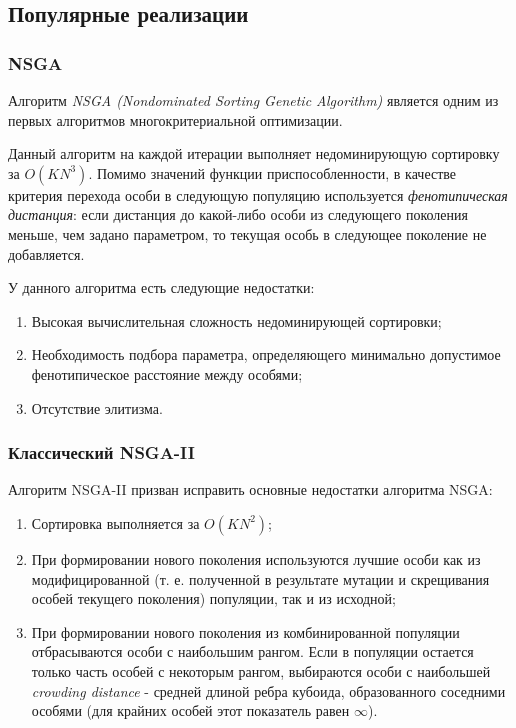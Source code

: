 \subsection{Популярные реализации}
\subsubsection{NSGA}
Алгоритм \textit{NSGA (Nondominated Sorting Genetic Algorithm)} является одним из первых алгоритмов
многокритериальной оптимизации. \cite{deb_nsga2}

Данный алгоритм на каждой итерации выполняет недоминирующую сортировку за $O(KN^3)$.
Помимо значений функции приспособленности, в качестве критерия перехода особи в следующую популяцию
используется \textit{фенотипическая дистанция}: если дистанция до какой-либо особи из следующего 
поколения меньше, чем задано параметром, то текущая особь в следующее поколение не добавляется. 
\cite{nsga1}

У данного алгоритма есть следующие недостатки: \cite{deb_nsga2}
\begin{enumerate}
\item Высокая вычислительная сложность недоминирующей сортировки;
\item Необходимость подбора параметра, определяющего минимально допустимое фенотипическое
	расстояние между особями;
\item Отсутствие элитизма.
\end{enumerate}

\subsubsection{Классический NSGA-II}
Алгоритм NSGA-II призван исправить основные недостатки алгоритма NSGA: \cite{deb_nsga2}
\begin{enumerate}
\item Сортировка выполняется за $O(KN^2)$;
\item При формировании нового поколения используются лучшие особи как из модифицированной
	(т. е. полученной в результате мутации и скрещивания особей текущего поколения) 
	популяции, так и из исходной;
\item При формировании нового поколения из комбинированной популяции отбрасываются особи
	с наибольшим рангом. Если в популяции остается только часть особей с некоторым рангом,
	выбираются особи с наибольшей \textit{crowding distance} - средней длиной ребра кубоида,
	образованного соседними особями (для крайних особей этот показатель равен $\infty$).
\end{enumerate}

